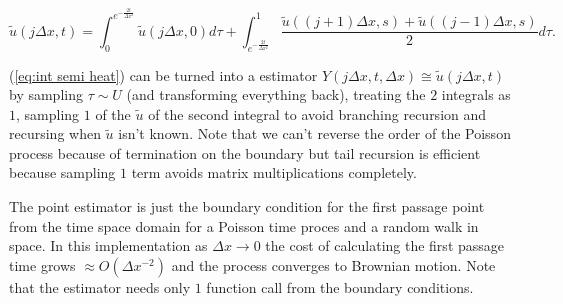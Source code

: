 \documentclass[a4paper,12pt]{article}
\begin{document}




\begin{equation}
    \tilde{u}(j \Delta x,t) = \int_{0}^{e^{-\frac{2t}{\Delta x^{2}}}}  \tilde{u}(j \Delta x,0) d\tau+
    \int_{e^{-\frac{2t}{\Delta x^{2}}}}^{1} \frac{\tilde{u}((j+1) \Delta x,s)+\tilde{u}((j-1) \Delta x,s)}{2}d\tau. \label{eq:int semi heat}
\end{equation}



\begin{julia}\label{jl:point estimator heat}

    (\ref{eq:int semi heat}) can be turned into a estimator $Y(j \Delta x,t,\Delta x ) \cong  \tilde{u}(j \Delta x,t)$
    by sampling $\tau \sim U$ (and transforming everything back), treating the $2$ integrals as $1$,
    sampling $1$ of the $\tilde{u}$ of the second integral to avoid branching recursion and
    recursing when $\tilde{u}$ isn't known. Note that we can't reverse the order of the Poisson process
    because of termination on the boundary but tail recursion
    is efficient because sampling $1$ term avoids matrix multiplications completely.


    The point estimator is just the boundary condition
    for the first passage point from the time space domain for a Poisson time proces and a random walk in space.
    In this implementation as  $\Delta x \rightarrow 0$  the cost of calculating the first passage time grows
    $\approx O(\Delta x ^{-2})$ and the process converges to Brownian motion. Note that the estimator needs
    only $1$ function call from the boundary conditions.
\end{julia}
\end{document}
